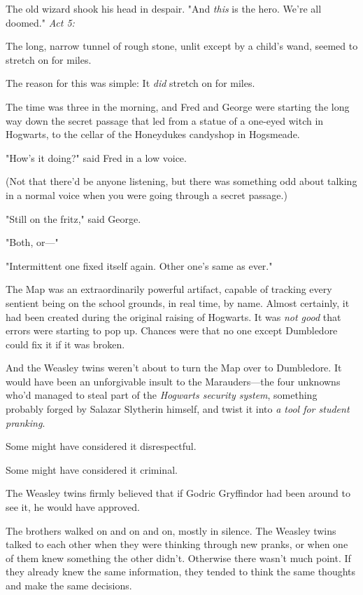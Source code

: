 The old wizard shook his head in despair. "And \emph{this} is the hero. We're 
all doomed."
\sbreak
\emph{Act 5:}

The long, narrow tunnel of rough stone, unlit except by a child's wand, seemed 
to stretch on for miles.

The reason for this was simple: It \emph{did} stretch on for miles.

The time was three in the morning, and Fred and George were starting the long 
way down the secret passage that led from a statue of a one-eyed witch in 
Hogwarts, to the cellar of the Honeydukes candyshop in Hogsmeade.

"How's it doing?" said Fred in a low voice.

(Not that there'd be anyone listening, but there was something odd about 
talking in a normal voice when you were going through a secret passage.)

"Still on the fritz," said George.

"Both, or---"

"Intermittent one fixed itself again. Other one's same as ever."

The Map was an extraordinarily powerful artifact, capable of tracking every 
sentient being on the school grounds, in real time, by name. Almost certainly, 
it had been created during the original raising of Hogwarts. It was \emph{not 
good} that errors were starting to pop up. Chances were that no one except 
Dumbledore could fix it if it was broken.

And the Weasley twins weren't about to turn the Map over to Dumbledore. It 
would have been an unforgivable insult to the Marauders---the four unknowns 
who'd managed to steal part of the \emph{Hogwarts security system}, something 
probably forged by Salazar Slytherin himself, and twist it into \emph{a tool 
for student pranking}.

Some might have considered it disrespectful.

Some might have considered it criminal.

The Weasley twins firmly believed that if Godric Gryffindor had been around to 
see it, he would have approved.

The brothers walked on and on and on, mostly in silence. The Weasley twins 
talked to each other when they were thinking through new pranks, or when one of 
them knew something the other didn't. Otherwise there wasn't much point. If 
they already knew the same information, they tended to think the same thoughts 
and make the same decisions.

